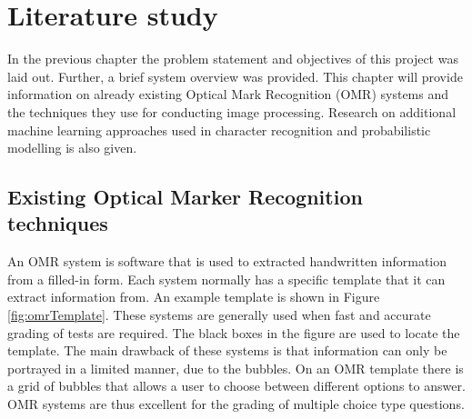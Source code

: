 \chapter{Literature study}
\label{ch:LiteratureStudy}
\graphicspath{{Chapter2/Chapter2Figures/}}
In the previous chapter the problem statement and objectives of this project was laid out. Further, a brief system overview was provided.
This chapter will provide information on already existing Optical Mark Recognition (OMR) systems and the techniques they use for conducting image processing. Research on additional machine learning approaches used in character recognition and probabilistic modelling is also given.

\section{Existing Optical Marker Recognition techniques}
An OMR system is software that is used to extracted handwritten information from a filled-in form. Each system normally has a specific template that it can extract information from. An example template is shown in Figure \ref{fig:omrTemplate}. These systems are generally used when fast and accurate grading of tests are required. The black boxes in the figure are used to locate the template. The main drawback of these systems is that information can only be portrayed in a limited manner, due to the bubbles. On an OMR template there is a grid of bubbles that allows a user to choose between different options to answer. OMR systems are thus excellent for the grading of multiple choice type questions. 
